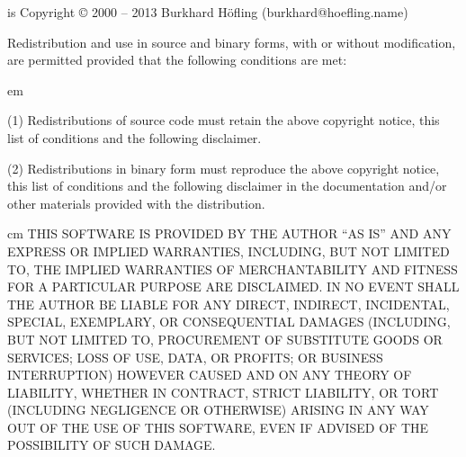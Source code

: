 
{\CRISP} is Copyright © 2000 – 2013 Burkhard Höfling (burkhard@hoefling.name)

Redistribution and use in source and binary forms, with or without
modification, are permitted provided that the following conditions are
met:
\medskip

{ em
\item{(1)} Redistributions of source code must retain the above copyright
    notice, this list of conditions and the following disclaimer. 

\item{(2)} Redistributions in binary form must reproduce the above copyright
    notice, this list of conditions and the following disclaimer in
    the documentation and/or other materials provided with the
    distribution. \par}
\medskip
    
{ cm 
THIS SOFTWARE IS PROVIDED BY THE AUTHOR ``AS IS'' AND ANY EXPRESS OR
IMPLIED WARRANTIES, INCLUDING, BUT NOT LIMITED TO, THE IMPLIED
WARRANTIES OF MERCHANTABILITY AND FITNESS FOR A PARTICULAR PURPOSE ARE
DISCLAIMED. IN NO EVENT SHALL THE AUTHOR BE LIABLE FOR ANY DIRECT,
INDIRECT, INCIDENTAL, SPECIAL, EXEMPLARY, OR CONSEQUENTIAL DAMAGES
(INCLUDING, BUT NOT LIMITED TO, PROCUREMENT OF SUBSTITUTE GOODS OR
SERVICES; LOSS OF USE, DATA, OR PROFITS; OR BUSINESS INTERRUPTION)
HOWEVER CAUSED AND ON ANY THEORY OF LIABILITY, WHETHER IN CONTRACT,
STRICT LIABILITY, OR TORT (INCLUDING NEGLIGENCE OR OTHERWISE) ARISING
IN ANY WAY OUT OF THE USE OF THIS SOFTWARE, EVEN IF ADVISED OF THE
POSSIBILITY OF SUCH DAMAGE.\par}

